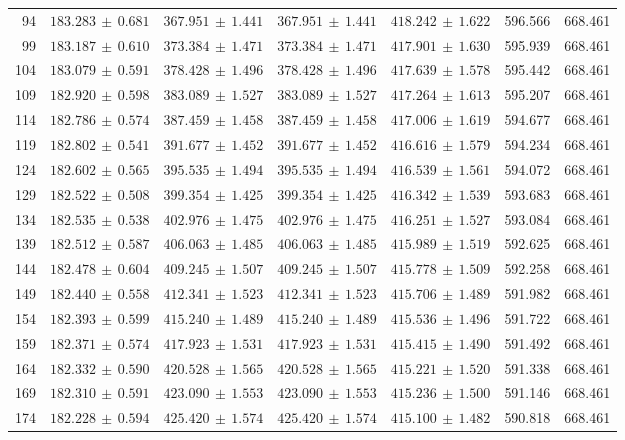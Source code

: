{\begin{longtable}{rrrrrrr}
94 & $183.283\,\pm\,0.681$ & $367.951\,\pm\,1.441$ & $367.951\,\pm\,1.441$ & $418.242\,\pm\,1.622$ & 596.566 & 668.461\\
99 & $183.187\,\pm\,0.610$ & $373.384\,\pm\,1.471$ & $373.384\,\pm\,1.471$ & $417.901\,\pm\,1.630$ & 595.939 & 668.461\\
104 & $183.079\,\pm\,0.591$ & $378.428\,\pm\,1.496$ & $378.428\,\pm\,1.496$ & $417.639\,\pm\,1.578$ & 595.442 & 668.461\\
109 & $182.920\,\pm\,0.598$ & $383.089\,\pm\,1.527$ & $383.089\,\pm\,1.527$ & $417.264\,\pm\,1.613$ & 595.207 & 668.461\\
114 & $182.786\,\pm\,0.574$ & $387.459\,\pm\,1.458$ & $387.459\,\pm\,1.458$ & $417.006\,\pm\,1.619$ & 594.677 & 668.461\\
119 & $182.802\,\pm\,0.541$ & $391.677\,\pm\,1.452$ & $391.677\,\pm\,1.452$ & $416.616\,\pm\,1.579$ & 594.234 & 668.461\\
124 & $182.602\,\pm\,0.565$ & $395.535\,\pm\,1.494$ & $395.535\,\pm\,1.494$ & $416.539\,\pm\,1.561$ & 594.072 & 668.461\\
129 & $182.522\,\pm\,0.508$ & $399.354\,\pm\,1.425$ & $399.354\,\pm\,1.425$ & $416.342\,\pm\,1.539$ & 593.683 & 668.461\\
134 & $182.535\,\pm\,0.538$ & $402.976\,\pm\,1.475$ & $402.976\,\pm\,1.475$ & $416.251\,\pm\,1.527$ & 593.084 & 668.461\\
139 & $182.512\,\pm\,0.587$ & $406.063\,\pm\,1.485$ & $406.063\,\pm\,1.485$ & $415.989\,\pm\,1.519$ & 592.625 & 668.461\\
144 & $182.478\,\pm\,0.604$ & $409.245\,\pm\,1.507$ & $409.245\,\pm\,1.507$ & $415.778\,\pm\,1.509$ & 592.258 & 668.461\\
149 & $182.440\,\pm\,0.558$ & $412.341\,\pm\,1.523$ & $412.341\,\pm\,1.523$ & $415.706\,\pm\,1.489$ & 591.982 & 668.461\\
154 & $182.393\,\pm\,0.599$ & $415.240\,\pm\,1.489$ & $415.240\,\pm\,1.489$ & $415.536\,\pm\,1.496$ & 591.722 & 668.461\\
159 & $182.371\,\pm\,0.574$ & $417.923\,\pm\,1.531$ & $417.923\,\pm\,1.531$ & $415.415\,\pm\,1.490$ & 591.492 & 668.461\\
164 & $182.332\,\pm\,0.590$ & $420.528\,\pm\,1.565$ & $420.528\,\pm\,1.565$ & $415.221\,\pm\,1.520$ & 591.338 & 668.461\\
169 & $182.310\,\pm\,0.591$ & $423.090\,\pm\,1.553$ & $423.090\,\pm\,1.553$ & $415.236\,\pm\,1.500$ & 591.146 & 668.461\\
174 & $182.228\,\pm\,0.594$ & $425.420\,\pm\,1.574$ & $425.420\,\pm\,1.574$ & $415.100\,\pm\,1.482$ & 590.818 & 668.461\\

\end{longtable}}
